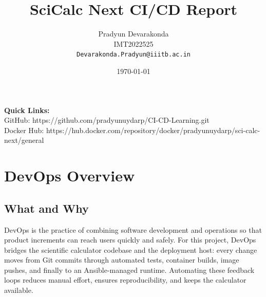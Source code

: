 \documentclass[12pt]{article}
\title{SciCalc Next CI/CD Report}
\author{Pradyun Devarakonda\\IMT2022525\\\texttt{Devarakonda.Pradyun@iiitb.ac.in}}
\date{\today}
\begin{document}
\maketitle
\begin{center}
\vspace{0.5em}\textbf{Quick Links:}\\
GitHub: https://github.com/pradyunuydarp/CI-CD-Learning.git \\
Docker Hub: https://hub.docker.com/repository/docker/pradyunuydarp/sci-calc-next/general \\
\end{center}
\par\vspace{1em}

\section{DevOps Overview}
\subsection*{What and Why}
DevOps is the practice of combining software development and operations so that product increments can reach users quickly and safely. For this project, DevOps bridges the scientific calculator codebase and the deployment host: every change moves from Git commits through automated tests, container builds, image pushes, and finally to an Ansible-managed runtime. Automating these feedback loops reduces manual effort, ensures reproducibility, and keeps the calculator available.
\end{document}
